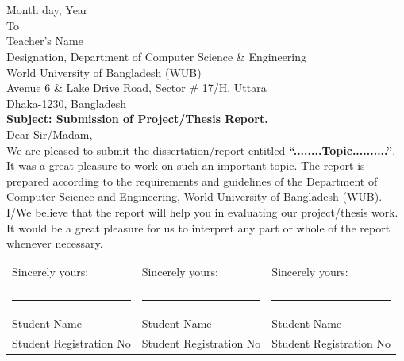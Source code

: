 \clearpage
{}
{}
\chapter*{{\fontsize{14pt}{16.8pt}}}

\vspace{-1em}
\noindent
\fontsize{12pt}{14.4pt}\selectfont Month day, Year \\

\noindent 
To \\
Teacher's Name \\
Designation, Department of Computer Science \& Engineering \\
World University of Bangladesh (WUB) \\
Avenue 6 \& Lake Drive Road, Sector \# 17/H, Uttara \\
Dhaka-1230, Bangladesh \\

\noindent \textbf{Subject: Submission of Project/Thesis Report.} \\

\noindent Dear Sir/Madam, \\
We are pleased to submit the dissertation/report entitled \textbf{“........Topic..........”}. It was a great pleasure to work on such an important topic. The report is prepared according to the requirements and guidelines of the Department of Computer Science and Engineering, World University of Bangladesh (WUB). \\

\noindent I/We believe that the report will help you in evaluating our project/thesis work. It would be a great pleasure for us to interpret any part or whole of the report whenever necessary.

\vfill

\begin{table}[htb!]
\begin{tabular}{p{} p{} p{} }

Sincerely yours: & Sincerely yours: & Sincerely yours: \\

\vspace{6.5pt} & \vspace{6.5pt} & \vspace{6.5pt} \\

\hrule & \hrule & \hrule \\

Student Name & Student Name & Student Name \\
Student Registration No & 
Student Registration No & 
Student Registration No 
\end{tabular}
\end{table}

\newpage